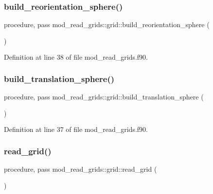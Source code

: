\subsubsection{\texorpdfstring{build\+\_\+reorientation\+\_\+sphere()}{build\_reorientation\_sphere()}}
{\footnotesize\ttfamily procedure, pass mod\+\_\+read\+\_\+grids\+::grid\+::build\+\_\+reorientation\+\_\+sphere (\begin{DoxyParamCaption}{ }\end{DoxyParamCaption})}



Definition at line 38 of file mod\+\_\+read\+\_\+grids.\+f90.

\mbox{\label{structmod__read__grids_1_1grid_aac42988e12ce7125a98fc21129c8398e}} 
\subsubsection{\texorpdfstring{build\+\_\+translation\+\_\+sphere()}{build\_translation\_sphere()}}
{\footnotesize\ttfamily procedure, pass mod\+\_\+read\+\_\+grids\+::grid\+::build\+\_\+translation\+\_\+sphere (\begin{DoxyParamCaption}{ }\end{DoxyParamCaption})}



Definition at line 37 of file mod\+\_\+read\+\_\+grids.\+f90.

\mbox{\label{structmod__read__grids_1_1grid_ace787ea57534b971bf911dd748b98e05}} 
\subsubsection{\texorpdfstring{read\+\_\+grid()}{read\_grid()}}
{\footnotesize\ttfamily procedure, pass mod\+\_\+read\+\_\+grids\+::grid\+::read\+\_\+grid (\begin{DoxyParamCaption}{ }\end{DoxyParamCaption})}



